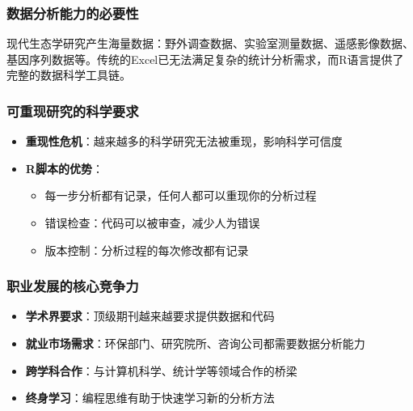 \documentclass[
]{book}
\providecommand{\tightlist}{%
  \setlength{\itemsep}{0pt}\setlength{\parskip}{0pt}}
\begin{document}
\hypertarget{ux6570ux636eux5206ux6790ux80fdux529bux7684ux5fc5ux8981ux6027}{%
\subsubsection{数据分析能力的必要性}\label{ux6570ux636eux5206ux6790ux80fdux529bux7684ux5fc5ux8981ux6027}}

现代生态学研究产生海量数据：野外调查数据、实验室测量数据、遥感影像数据、基因序列数据等。传统的Excel已无法满足复杂的统计分析需求，而R语言提供了完整的数据科学工具链。

\hypertarget{ux53efux91cdux73b0ux7814ux7a76ux7684ux79d1ux5b66ux8981ux6c42}{%
\subsubsection{可重现研究的科学要求}\label{ux53efux91cdux73b0ux7814ux7a76ux7684ux79d1ux5b66ux8981ux6c42}}

\begin{itemize}
\tightlist
\item
  \textbf{重现性危机}：越来越多的科学研究无法被重现，影响科学可信度
\item
  \textbf{R脚本的优势}：

  \begin{itemize}
  \tightlist
  \item
    每一步分析都有记录，任何人都可以重现你的分析过程
  \item
    错误检查：代码可以被审查，减少人为错误
  \item
    版本控制：分析过程的每次修改都有记录
  \end{itemize}
\end{itemize}

\hypertarget{ux804cux4e1aux53d1ux5c55ux7684ux6838ux5fc3ux7adeux4e89ux529b}{%
\subsubsection{职业发展的核心竞争力}\label{ux804cux4e1aux53d1ux5c55ux7684ux6838ux5fc3ux7adeux4e89ux529b}}

\begin{itemize}
\tightlist
\item
  \textbf{学术界要求}：顶级期刊越来越要求提供数据和代码
\item
  \textbf{就业市场需求}：环保部门、研究院所、咨询公司都需要数据分析能力
\item
  \textbf{跨学科合作}：与计算机科学、统计学等领域合作的桥梁
\item
  \textbf{终身学习}：编程思维有助于快速学习新的分析方法
\end{itemize}
\end{document}
